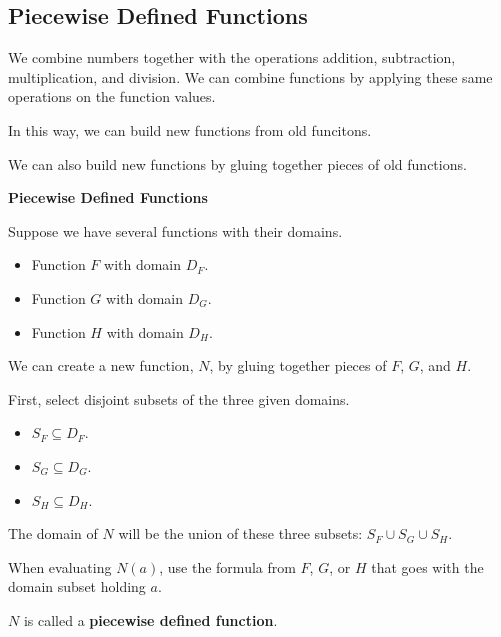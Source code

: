 \documentclass{ximera}
\begin{document}
\subsection*{Piecewise Defined Functions}













We combine numbers together with the operations addition, subtraction, multiplication, and division.  We can combine functions by applying these same operations on the function values.  

In this way, we can build new functions from old funcitons. 

We can also build new functions by gluing together pieces of old functions.



\begin{template} \textbf{\textcolor{blue!55!black}{Piecewise Defined Functions}} 


Suppose we have several functions with their domains.

\begin{itemize}
\item Function $F$ with domain $D_F$. 
\item Function $G$ with domain $D_G$. 
\item Function $H$ with domain $D_H$. 
\end{itemize}


We can create a new function, $N$, by gluing together pieces of $F$, $G$, and $H$.


First, select disjoint subsets of the three given domains.


\begin{itemize}
\item $S_F \subseteq D_F$. 
\item $S_G \subseteq D_G$. 
\item $S_H \subseteq D_H$. 
\end{itemize}


The domain of $N$ will be the union of these three subsets: $S_F \cup S_G \cup S_H$. 

When evaluating $N(a)$, use the formula from $F$, $G$, or $H$ that goes with the domain subset holding $a$.


\end{template}

$N$ is called a \textbf{\textcolor{blue!55!black}{piecewise defined function}}. 
\end{document}
